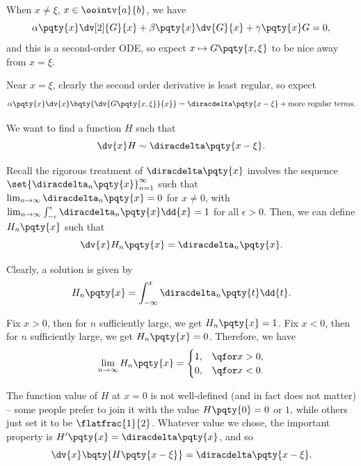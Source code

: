 When \(x \neq \xi\), \(x \in \oointv{a}{b}\), we have
\begin{equation}
    \alpha\pqty{x} \dv[2]{G}{x} + \beta\pqty{x} \dv{G}{x} + \gamma\pqty{x} G = 0,
\end{equation}
and this is a second-order ODE, so expect \(x \mapsto G\pqty{x, \xi}\) to be nice away from \(x = \xi\).

Near \(x = \xi\), clearly the second order derivative is least regular, so expect
\begin{equation}
    \alpha\pqty{x} \dv{x} \bqty{\dv{G\pqty{x, \xi}}{x}} = \diracdelta\pqty{x - \xi} + \text{more regular terms}.
\end{equation}

We want to find a function \(H\) such that
\begin{equation}
    \dv{x} H \sim \diracdelta\pqty{x - \xi}.
\end{equation}

Recall the rigorous treatment of \(\diracdelta\pqty{x}\) involves the sequence \(\set{\diracdelta_n\pqty{x}}_{n = 1}^{\infty}\) such that \(\lim_{n \to \infty} \diracdelta_n\pqty{x} = 0\) for \(x \neq 0\), with \(\lim_{n \to \infty} \int_{-\epsilon}^{\epsilon} \diracdelta_n\pqty{x} \dd{x} = 1\) for all \(\epsilon > 0\). Then, we can define \(H_n\pqty{x}\) such that
\begin{equation}
    \dv{x} H_n\pqty{x} = \diracdelta_n\pqty{x}.
\end{equation}

Clearly, a solution is given by
\begin{equation}
    H_n \pqty{x} = \int_{-\infty}^{x} \diracdelta_n\pqty{t} \dd{t}.
\end{equation}

Fix \(x > 0\), then for \(n\) sufficiently large, we get \(H_n\pqty{x} = 1\). Fix \(x < 0\), then for \(n\) sufficiently large, we get \(H_n\pqty{x} = 0\). Therefore, we have
\begin{equation}
    \lim_{n \to \infty} H_n\pqty{x} = \begin{cases}
        1, & \qfor x > 0, \\
        0, & \qfor x < 0.
    \end{cases}
\end{equation}

The function value of \(H\) at \(x = 0\) is not well-defined (and in fact does not matter) -- some people prefer to join it with the value \(H\pqty{0} = 0\) or \(1\), while others just set it to be \(\flatfrac{1}{2}\). Whatever value we chose, the important property is \(H'\pqty{x} = \diracdelta\pqty{x}\), and so
\begin{equation}
    \dv{x} \bqty{H\pqty{x - \xi}} = \diracdelta\pqty{x - \xi}.
\end{equation}

